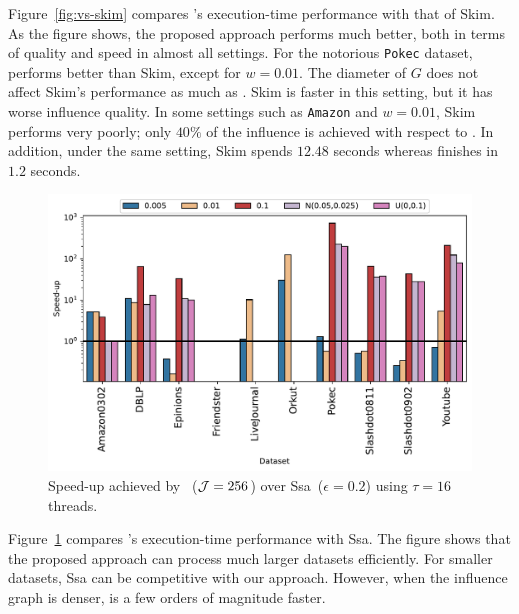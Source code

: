 Figure~\ref{fig:vs-skim} compares \acro's execution-time performance with that of {\sc Skim}. As the figure shows, the proposed approach performs much better, both in terms of quality and speed in almost all settings. For the notorious {\tt Pokec} dataset, \acro performs better than {\sc Skim}, except for $w = 0.01$. The diameter of $G$ does not affect {\sc Skim}'s performance as much as \acro. {\sc Skim} is faster in this setting, but it has worse influence quality. In some settings such as {\tt Amazon} and $w = 0.01$, {\sc Skim} performs very poorly; only $40\%$ of the influence is achieved with respect to \acro. In addition, under the same setting, {\sc Skim} spends $12.48$ seconds whereas \acro finishes in $1.2$ seconds.
  \begin{figure}[!ht] 
     \centering
     \includegraphics[width=1\linewidth]{images/speedup-ssa}
   \centering \caption{Speed-up achieved by \acro{}~(${\cal J} = 256$) over {\sc Ssa}~($\epsilon=0.2$) using $\tau=16$ threads.
     \label{fig:vs-ssa}} 
 \end{figure}
 
Figure~\ref{fig:vs-ssa} compares \acro's execution-time performance with {\sc Ssa}. The figure shows that the proposed approach can process much larger datasets efficiently. For smaller datasets, {\sc Ssa} can be competitive with our approach. However, when the influence graph is denser, \acro{} is a few orders of magnitude faster. 



